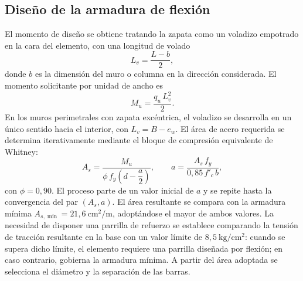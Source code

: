 \subsection{Diseño de la armadura de flexión}
El momento de diseño se obtiene tratando la zapata como un voladizo empotrado en la cara del elemento, con una longitud de volado
\begin{equation}
L_v = \frac{L - b}{2},
\end{equation}
donde $b$ es la dimensión del muro o columna en la dirección considerada. El momento solicitante por unidad de ancho es
\begin{equation}
M_u = \frac{q_u \, L_v^2}{2}.
\end{equation}
En los muros perimetrales con zapata excéntrica, el voladizo se desarrolla en un único sentido hacia el interior, con $L_v = B - e_w$. El área de acero requerida se determina iterativamente mediante el bloque de compresión equivalente de Whitney:
\begin{equation}
A_s = \frac{M_u}{\phi \, f_y \left( d - \dfrac{a}{2} \right)}, \qquad a = \frac{A_s \, f_y}{0,85 \, f'_c \, b},
\end{equation}
con $\phi = 0,90$. El proceso parte de un valor inicial de $a$ y se repite hasta la convergencia del par $(A_s, a)$. El área resultante se compara con la armadura mínima $A_{s,\min} = 21,6~\mathrm{cm^2/m}$, adoptándose el mayor de ambos valores. La necesidad de disponer una parrilla de refuerzo se establece comparando la tensión de tracción resultante en la base con un valor límite de $8,5~\mathrm{kg/cm^2}$: cuando se supera dicho límite, el elemento requiere una parrilla diseñada por flexión; en caso contrario, gobierna la armadura mínima. A partir del área adoptada se selecciona el diámetro y la separación de las barras.